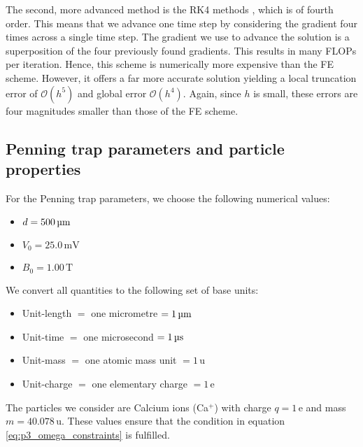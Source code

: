 The second, more advanced method is the RK4 methods \citep{Atkinson1989}, which is of fourth order. This means that we advance one time step by considering the gradient four times across a single time step. The gradient we use to advance the solution is a superposition of the four previously found gradients. This results in many FLOPs per iteration. Hence, this scheme is numerically more expensive than the FE scheme. However, it offers a far more accurate solution yielding a local truncation error of $\mathcal{O}(h^5)$ and global error $\mathcal{O}(h^4)$. Again, since $h$ is small, these errors are four magnitudes smaller than those of the FE scheme. 

 
\subsection{Penning trap parameters and particle properties}\label{subsec_methods:numbers_and_units}
For the Penning trap parameters, we choose the following numerical values:
\begin{itemize}
    \item[] $d=500 \,\mathrm{\text{\textmu} m}$
    \item[] $V_0=25.0 \,\mathrm{mV}$
    \item[] $B_0=1.00 \,\mathrm{T}$
\end{itemize}
We convert all quantities to the following set of base units:
\begin{itemize}
    \item[] Unit-length $=$ one micrometre $= 1\, \mathrm{\text{\textmu}m} $ 
    \item[] Unit-time $=$ one microsecond $= 1\, \mathrm{\text{\textmu}s} $
    \item[] Unit-mass $=$ one atomic mass unit $= 1\, \mathrm{u} $
    \item[] Unit-charge $=$ one elementary charge $= 1\, \mathrm{e} $
\end{itemize}
The particles we consider are Calcium ions (Ca$^+$) with charge $q=1 \,\mathrm{e}$ and mass $m = 40.078 \,\mathrm{u}$. These values ensure that the condition in equation \eqref{eq:p3_omega_constraints} is fulfilled. 



